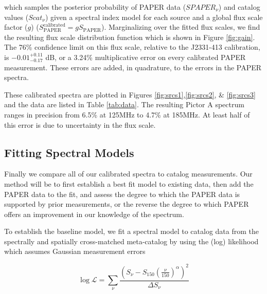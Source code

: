 \documentclass[preprint]{aastex}
\newcommand{\logL}{\log\mathcal{L}}
\newcommand{\PAPER}{\mathrm{PAPER}}
\begin{document}
which samples the posterior probability of PAPER data ($SPAPER_{\nu}$) and
catalog values ($Scat_{\nu}$) given a spectral index model for each source and
a global flux scale factor ($g$) ($S_\PAPER^\textrm{calibrated} = g S_\PAPER$).
Marginalizing over the fitted flux scales, we find the resulting flux scale distribution function which is shown in Figure
\ref{fig:gain}. The 76\% confidence limit on this flux scale, relative to the
J2331-413 calibration, is  $-0.01 ^{+0.11}_{-0.17}$ dB, or a 3.24\%
multiplicative error on every calibrated PAPER measurement.  These errors are added, in quadrature,
to the errors in the PAPER spectra.


These calibrated spectra are plotted in Figures \ref{fig:srcs1},\ref{fig:srcs2},
\& \ref{fig:srcs3} and the data are listed in Table \ref{tab:data}.  The
resulting Pictor A spectrum ranges in precision from 6.5\% at 125MHz to 4.7\%
at 185MHz. At least half of this error is due to uncertainty in the flux scale.  



\subsection{Fitting Spectral Models}
\label{sec:fitting_models}

Finally we compare all of our  calibrated spectra to catalog measurements. Our method
will be to first establish a best fit model to existing data, then add the PAPER data
to the fit, and assess the degree to which the PAPER data is supported by prior measurements, or the reverse
the degree to which PAPER offers an improvement in our knowledge of the spectrum.

 To establish the baseline model, we
fit a spectral model to catalog data from the spectrally and spatially
cross-matched meta-catalog by \citet{Vollmer:2010p6422} using the
 (log) likelihood which assumes Gaussian measurement errors

\begin{equation}
\logL = \sum_\nu{\frac{\left(S_\nu - S_{150}\left(\frac{\nu}{150}\right)^\alpha\right)^2}{\Delta S_\nu} }
\end{equation}
\end{document}
